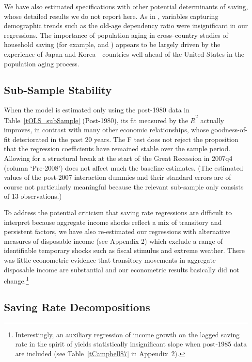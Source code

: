 \documentclass[titlepage]{\econtex}
\begin{document}
We have also estimated specifications with other potential determinants of saving, whose
detailed results we do not report here. As in
\citet{parker_nberma_spendthrift}, variables capturing demographic trends such as the
old-age dependency ratio were insignificant in our regressions. The
importance of population aging in cross--country studies of household
saving (for example, \cite{bloomEtAl_JME07} and
\cite{bosworthChodorowReich07}) appears to be largely driven by the
experience of Japan and Korea---countries well ahead of the United
States in the population aging process.

\subsection{Sub-Sample Stability}

When the model is estimated only using the post-1980 data in Table~\ref{tOLS_subSample}
(Post-1980), its fit measured by the $\bar{R}^2$ actually
improves, in contrast with many other economic relationships,  %
 whose goodness-of-fit deteriorated in the past 20 years.
 The F test does not reject the proposition that the regression coefficients have remained stable over the sample period. Allowing for a structural break at the start of the Great Recession in 2007q4 (column `Pre-2008') does not affect much the baseline estimates. (The estimated values of the post-2007 interaction dummies and their standard errors are of course not particularly meaningful because the relevant sub-sample only consists of 13 observations.)

To address the potential criticism that saving rate regressions are
difficult to interpret because aggregate income shocks reflect a mix
of transitory and persistent factors, we have also re-estimated our
regressions with alternative measures of disposable income (see
Appendix 2) which exclude a range of identifiable temporary shocks
such as fiscal stimulus and extreme weather. There was little
econometric evidence that transitory movements in aggregate disposable
income are substantial and our econometric results basically did not
change.\footnote{Interestingly, an auxiliary regression of income
  growth on the lagged saving rate in the spirit of \cite{cam87}
  yields statistically insignificant slope when post-1985 data are
  included (see Table~\ref{tCampbell87} in Appendix~2).  }

\subsection{Saving Rate Decompositions}
\end{document}
